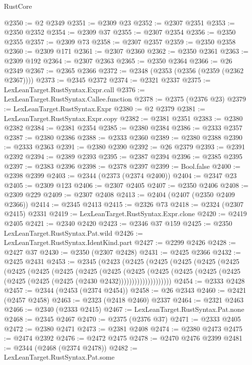 \begin{lexlean}{RustCore}
\begin{coremodule}
@2350 := @2 @2349
@2351 := @2309 @23
@2352 := @2307 @2351
@2353 := @2350 @2352
@2354 := @2309 @37
@2355 := @2307 @2354
@2356 := @2350 @2355
@2357 := @2309 @73
@2358 := @2307 @2357
@2359 := @2350 @2358
@2360 := @2309 @171
@2361 := @2307 @2360
@2362 := @2350 @2361
@2363 := @2309 @192
@2364 := @2307 @2363
@2365 := @2350 @2364
@2366 := @26 @2349
@2367 := @2365 @2366
@2372 := @2348 (@2353 (@2356 (@2359 (@2362 @2367))))
@2373 := @2345 @2372
@2374 := @2321 @2337
@2375 := LexLeanTarget.RustSyntax.Expr.call
@2376 := LexLeanTarget.RustSyntax.Callee.function
@2378 := @2375 (@2376 @23)
@2379 := LexLeanTarget.RustSyntax.Expr
@2380 := @2 @2379
@2381 := LexLeanTarget.RustSyntax.Expr.copy
@2382 := @2381 @2351
@2383 := @2380 @2382
@2384 := @2381 @2354
@2385 := @2380 @2384
@2386 := @2333 @2357
@2387 := @2380 @2386
@2388 := @2333 @2360
@2389 := @2380 @2388
@2390 := @2333 @2363
@2391 := @2380 @2390
@2392 := @26 @2379
@2393 := @2391 @2392
@2394 := @2389 @2393
@2395 := @2387 @2394
@2396 := @2385 @2395
@2397 := @2383 @2396
@2398 := @2378 @2397
@2399 := Bool.false
@2400 := @2398 @2399
@2403 := @2344 (@2373 (@2374 @2400))
@2404 := @2347 @23
@2405 := @2309 @123
@2406 := @2307 @2405
@2407 := @2350 @2406
@2408 := @2309 @229
@2409 := @2307 @2408
@2413 := @2404 (@2407 (@2350 @2409 @2366))
@2414 := @2345 @2413
@2415 := @2326 @73
@2418 := @2324 (@2307 @2415) @2331
@2419 := LexLeanTarget.RustSyntax.Expr.clone
@2420 := @2419 @2405
@2421 := @2340 @2420
@2423 := @2346 @37 @159
@2425 := @2350 LexLeanTarget.RustSyntax.Pat.wild
@2426 := LexLeanTarget.RustSyntax.IdentKind.part
@2427 := @2299 @2426
@2428 := @2427 @37
@2430 := @2350 (@2307 @2428)
@2431 := @2425 @2366
@2432 := @2425 @2431
@2453 := @2345
    (@2423
      (@2425
        (@2425
          (@2425
            (@2425
              (@2425
                (@2425
                  (@2425
                    (@2425
                      (@2425
                        (@2425
                          (@2425
                            (@2425
                              (@2425
                                (@2425 (@2425 (@2425 (@2425 (@2425 (@2430 @2432))))))))))))))))))))
@2454 := @2333 @2428
@2457 := @2344 (@2453 (@2374 @2454))
@2458 := @26 @2343
@2460 := @2421 (@2457 @2458)
@2463 := @2323 (@2418 @2460) @2337
@2464 := @2321 @2463
@2466 := @2340 (@2333 @2415)
@2467 := LexLeanTarget.RustSyntax.Pat.none
@2468 := @2345 @2467
@2470 := @2375 (@2376 @37)
@2471 := @2333 @2405
@2472 := @2380 @2471
@2473 := @2381 @2408
@2474 := @2380 @2473
@2475 := @2474 @2392
@2476 := @2472 @2475
@2478 := @2470 @2476 @2399
@2481 := @2344 (@2468 (@2374 @2478))
@2482 := LexLeanTarget.RustSyntax.Pat.some

\end{coremodule}
\end{lexlean}
